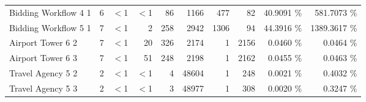 \begin{tabular}{|l|r|rrr|rrr|rr|}
  Bidding Workflow 4 1 &   6 & $<$1 & $<$1 & 86 & 1166 & 477 &  82 & 40.9091 \% &  581.7073 \% \\ 
Bidding Workflow 5 1 &   7 & $<$1 & 2 & 258 & 2942 & 1306 &  94 & 44.3916 \% & 1389.3617 \% \\ 
  Airport Tower 6 2 &   7 & $<$1 & 20 & 326 & 2174 & 1 & 2156 &  0.0460 \% &    0.0464 \% \\ 
  Airport Tower 6 3 &   7 & $<$1 & 51 & 248 & 2198 & 1 & 2162 &  0.0455 \% &    0.0463 \% \\ 
  Travel Agency 5 2 &   2 & $<$1 & $<$1 & 4 & 48604 & 1 & 248 &  0.0021 \% &    0.4032 \% \\ 
  Travel Agency 5 3 &   2 & $<$1 & $<$1 & 3 & 48977 & 1 & 308 &  0.0020 \% &    0.3247 \% \\ 
   \hline
\end{tabular}
